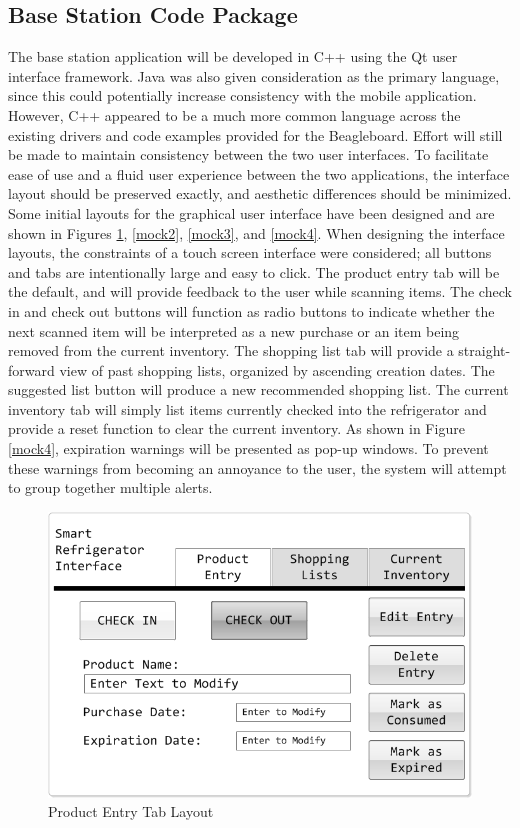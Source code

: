 \documentclass[11pt]{article} %
\begin{document}
\subsection{Base Station Code Package}
The base station application will be developed in C++ using the Qt user interface framework. Java was also given consideration as the primary language, since this could potentially increase consistency with the mobile application. However, C++ appeared to be a much more common language across the existing drivers and code examples provided for the Beagleboard. Effort will still be made to maintain consistency between the two user interfaces. To facilitate ease of use and a fluid user experience between the two applications, the interface layout should be preserved exactly, and aesthetic differences should be minimized. Some initial layouts for the graphical user interface have been designed and are shown in Figures \ref{mock1}, \ref{mock2}, \ref{mock3}, and \ref{mock4}. When designing the interface layouts, the constraints of a touch screen interface were considered; all buttons and tabs are intentionally large and easy to click. The product entry tab will be the default, and will provide feedback to the user while scanning items. The check in and check out buttons will function as radio buttons to indicate whether the next scanned item will be interpreted as a new purchase or an item being removed from the current inventory. The shopping list tab will provide a straight-forward view of past shopping lists, organized by ascending creation dates. The suggested list button will produce a new recommended shopping list. The current inventory tab will simply list items currently checked into the refrigerator and provide a reset function to clear the current inventory. As shown in Figure \ref{mock4}, expiration warnings will be presented as pop-up windows. To prevent these warnings from becoming an annoyance to the user, the system will attempt to group together multiple alerts.
\pagebreak
\begin{figure}[h!]
\vspace{0.5cm}
\begin{center}
\includegraphics[scale=0.5]{../graphics/MockUp1}
\caption{Product Entry Tab Layout}
\label{mock1}
\end{center}
\end{figure}
\end{document}
